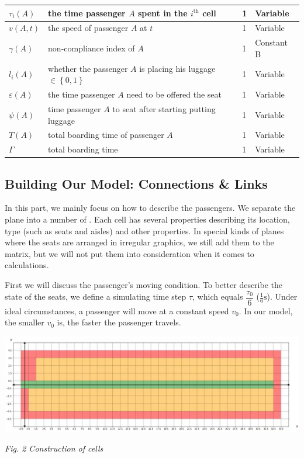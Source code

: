 \documentclass{article}
\newcommand{\cB}{\color{allandarkblue}Constant B\color{black}}
\newcommand{\varr}{\color{allanpurple}Variable\color{black}}
\theoremstyle{definition}
\theoremstyle{remark}
\numberwithin{equation}{section}
\begin{document}
\begin{center}
\begin{tabular}{|l|l|l|l|}
		\hline
		$\tau _i\left( A \right)$&the time passenger $A$ spent in the $i^\text{th}$ cell&1&\varr\\
		\hline
		$v\left( A,t \right)$&the speed of passenger $A$ at $t$&1&\varr\\
		\hline
		$\gamma \left( A \right)$&non-compliance index of \(A\)&1&\cB\\
		\hline
		$l_i\left( A \right)$&whether the passenger $A$ is placing his luggage \(\in\left\{0,1\right\}\)&1&\varr\\
		\hline
		$\varepsilon \left( A \right)$&the time passenger $A$ need to be offered the seat&1&\varr\\
		\hline
		$\psi \left( A \right)$&time passenger $A$ to seat after starting putting luggage&1&\varr\\
		\hline
		$T\left( A \right)$&total boarding time of passenger $A$&1&\varr\\
		\hline
		$\Gamma$ &total boarding time&1&\varr\\
		\hline
	\end{tabular}
	\end{center}
	\subsection{Building Our Model: Connections \& Links}
	In this part, we mainly focus on how to describe the passengers. We separate the plane into a number of . Each cell has several properties describing its location, type (such as seats and aisles) and other properties. In special kinds of planes where the seats are arranged in irregular graphics, we still add them to the matrix, but we will not put them into consideration when it comes to calculations.

	First we will discuss the passenger's moving condition. To better describe the state of the seats, we define a simulating time step $\tau$, which equals $\dfrac{\tau_0}{6}$ ($\frac{1}{6}\mathrm{s}$). Under ideal circumstances, a passenger will move at a constant speed $v_0$. In our model, the smaller $v_0$ is, the faster the passenger travels.

	\begin{center}
		\includegraphics[width = 14cm]{cell_visualization.jpg}

		\small\textit{Fig. 2 Construction of cells}
	\end{center}
\end{document}
